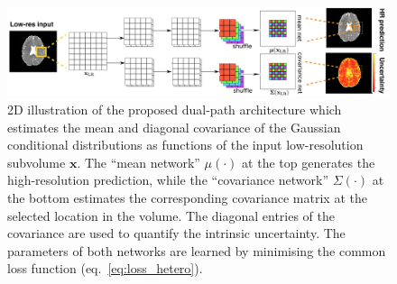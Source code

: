 \begin{figure}
	\includegraphics[width=\linewidth]{chapter_3/figures/fig_2_3.png}
	\centering	
	\caption{2D illustration of the proposed dual-path architecture which estimates the mean and diagonal covariance of the Gaussian conditional distributions as functions of the input low-resolution subvolume $\mathbf{x}$.  The ``mean network'' $\mu(\cdot)$ at the top generates the high-resolution prediction, while the ``covariance network''  $\Sigma(\cdot)$ at the bottom estimates the corresponding covariance matrix at the selected location in the volume. The diagonal entries of the covariance are used to quantify the intrinsic uncertainty. The parameters of both networks are learned by minimising the common loss function (eq.~\eqref{eq:loss_hetero}).} 
	\label{fig:hetero}
\end{figure}

